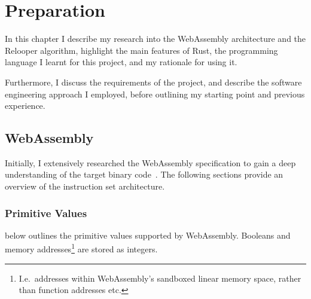 \documentclass[00-main.tex]{subfiles}
\begin{document}
\chapter{Preparation}

In this chapter I describe my research into the WebAssembly architecture and the Relooper algorithm, highlight the main features of Rust, the programming language I learnt for this project, and my rationale for using it.

Furthermore, I discuss the requirements of the project, and describe the software engineering approach I employed, before outlining my starting point and previous experience.

\section{WebAssembly}

Initially, I extensively researched the WebAssembly specification to gain a deep understanding of the target binary code~.
The following sections provide an overview of the instruction set architecture.

\subsection{Primitive Values}

 below outlines the primitive values supported by WebAssembly.
Booleans and memory addresses\footnote{I.e.\ addresses within WebAssembly's sandboxed linear memory space, rather than function addresses etc.} are stored as integers.

\begin{table}[t]
  \addtolength{\belowcaptionskip}{\medskipamount}
  \centering
  \caption{Summary of the primitive types supported by WebAssembly. The `constructor' is the name of the type in code and in the specification.}
  \label{tab:wasm value types} %
\end{table}
\end{document}

